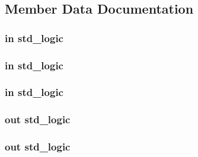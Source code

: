 \subsection{Member Data Documentation}
\subsubsection[{astb}]{ {\bfseries \textcolor{vhdlkeyword}{in}\textcolor{vhdlchar}{ }} {\bfseries \textcolor{comment}{std\-\_\-logic}\textcolor{vhdlchar}{ }} \hspace{0.3cm}{\ttfamily [Port]}}\label{classdpimref_a162b1c43b356d059b6b058eb5588db73}
\subsubsection[{btn}]{ {\bfseries \textcolor{vhdlkeyword}{in}\textcolor{vhdlchar}{ }} {\bfseries \textcolor{comment}{std\-\_\-logic}\textcolor{vhdlchar}{ }} \hspace{0.3cm}{\ttfamily [Port]}}\label{classdpimref_a491996e051654fec9e71b1eacd8a2dbc}
\subsubsection[{dstb}]{ {\bfseries \textcolor{vhdlkeyword}{in}\textcolor{vhdlchar}{ }} {\bfseries \textcolor{comment}{std\-\_\-logic}\textcolor{vhdlchar}{ }} \hspace{0.3cm}{\ttfamily [Port]}}\label{classdpimref_a7d7a2532d0452a8ae006c5c6249236cb}
\subsubsection[{ldg}]{ {\bfseries \textcolor{vhdlkeyword}{out}\textcolor{vhdlchar}{ }} {\bfseries \textcolor{comment}{std\-\_\-logic}\textcolor{vhdlchar}{ }} \hspace{0.3cm}{\ttfamily [Port]}}\label{classdpimref_ad07d818b50b5e6324de59eedeb746c57}
\subsubsection[{led}]{ {\bfseries \textcolor{vhdlkeyword}{out}\textcolor{vhdlchar}{ }} {\bfseries \textcolor{comment}{std\-\_\-logic}\textcolor{vhdlchar}{ }} \hspace{0.3cm}{\ttfamily [Port]}}\label{classdpimref_ac12da1d4d495afcf844c2acc65afe21b}
